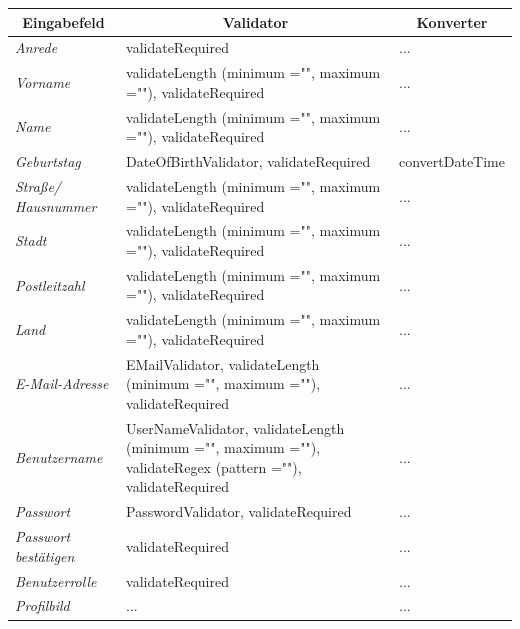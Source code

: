 \begin{itemize}
\begin{center}
\begin{longtable}{|p{3cm} |p{8cm} | p{5cm}|}
						\hline \multicolumn{1}{|c|}{\textbf{Eingabefeld}} & \multicolumn{1}{|c|}{\textbf{Validator}} & \multicolumn{1}{|c|}{\textbf{Konverter}} \\ \hline
						\endfirsthead
						\hline
						\endlastfoot
						\textit{Anrede} & validateRequired & ... \\ \hline
						\textit{Vorname} & validateLength (minimum ="", maximum =""), validateRequired & ... \\ \hline
						\textit{Name} & validateLength (minimum ="", maximum =""), validateRequired & ...  \\ \hline
						\textit{Geburtstag} & DateOfBirthValidator, validateRequired & convertDateTime  \\ \hline
						\textit{Straße/ Hausnummer} & validateLength (minimum ="", maximum =""), validateRequired & ... \\ \hline
						\textit{Stadt} & validateLength (minimum ="", maximum =""), validateRequired & ...  \\ \hline
						\textit{Postleitzahl} & validateLength (minimum ="", maximum =""), validateRequired & ... \\ \hline
						\textit{Land} & validateLength (minimum ="", maximum =""), validateRequired & ...  \\ \hline
						\textit{E-Mail-Adresse} & EMailValidator, validateLength (minimum ="", maximum =""), validateRequired & ... \\ \hline
						\textit{Benutzername} & UserNameValidator, validateLength (minimum ="", maximum =""), validateRegex (pattern =""), validateRequired  & ... \\ \hline
						\textit{Passwort} & PasswordValidator, validateRequired & ...  \\ \hline
						\textit{Passwort bestätigen} & validateRequired & ... \\ \hline
						\textit{Benutzerrolle} & validateRequired & ... \\ \hline
						\textit{Profilbild} & ... & ... \\ \hline
					\end{longtable}
				\end{center}
				

\end{itemize}
